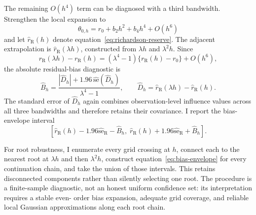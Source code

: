 The remaining $O(h^4)$ term can be diagnosed with a third bandwidth. Strengthen
the local expansion to
\begin{equation}
\theta_{0,h}=r_0+b_2h^2+b_4h^4+O(h^6)
\end{equation}
and let $\widehat r_{\mathrm R}(h)$ denote
equation~\eqref{eq:richardson-reserve}. The adjacent extrapolation is
$\widehat r_{\mathrm R}(\lambda h)$, constructed from $\lambda h$ and
$\lambda^2h$. Since
\begin{equation}
r_{\mathrm R}(\lambda h)-r_{\mathrm R}(h)
=(\lambda^4-1)\{r_{\mathrm R}(h)-r_0\}+O(h^6),
\end{equation}
the absolute residual-bias diagnostic is
\begin{equation}
\widehat B_h=
\frac{|\widehat D_h|+1.96\,\widehat{\mathrm{se}}(\widehat D_h)}
{\lambda^4-1},
\qquad
\widehat D_h=\widehat r_{\mathrm R}(\lambda h)
-\widehat r_{\mathrm R}(h).
\label{eq:residual-bias-bound}
\end{equation}
The standard error of $\widehat D_h$ again combines observation-level
influence values across all three bandwidths and therefore retains their
covariance. I report the bias-envelope interval
\begin{equation}
\left[\widehat r_{\mathrm R}(h)-1.96\widehat{\mathrm{se}}_{\mathrm R}
-\widehat B_h,\;
\widehat r_{\mathrm R}(h)+1.96\widehat{\mathrm{se}}_{\mathrm R}
+\widehat B_h\right].
\label{eq:bias-envelope}
\end{equation}

For root robustness, I enumerate every grid crossing at $h$, connect each to
the nearest root at $\lambda h$ and then $\lambda^2h$, construct
equation~\eqref{eq:bias-envelope} for every continuation chain, and take the
union of those intervals. This retains disconnected components rather than
silently selecting one root. The procedure is a finite-sample diagnostic, not
an honest uniform confidence set: its interpretation requires a stable even-
order bias expansion, adequate grid coverage, and reliable local Gaussian
approximations along each root chain.
